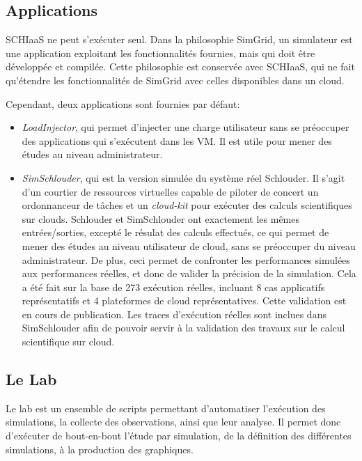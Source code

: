 \documentclass[parallelisme]{compas2017}
\begin{document}
\subsection{Applications}

SCHIaaS ne peut s'exécuter seul. Dans  la philosophie SimGrid, un simulateur est
une  application exploitant  les fonctionnalités  fournies, mais  qui doit  être
développée et  compilée.  Cette philosophie  est conservée avec SCHIaaS,  qui ne
fait qu'étendre les  fonctionnalités de SimGrid avec celles  disponibles dans un
cloud.

Cependant, deux applications sont fournies par défaut: 
\begin{itemize}
\item \emph{LoadInjector}, qui permet d'injecter  une charge utilisateur sans se
  préoccuper des  applications qui s'exécutent  dans les  VM. Il est  utile pour
  mener des études au niveau administrateur.
\item  \emph{SimSchlouder},  qui   est  la  version  simulée   du  système  réel
  Schlouder\cite{Michon2017}.  Il s'agit d'un  courtier de ressources virtuelles
  capable   de  piloter   de   concert   un  ordonnanceur   de   tâches  et   un
  \textit{cloud-kit}  pour  exécuter  des   calculs  scientifiques  sur  clouds.
  Schlouder et SimSchlouder ont exactement les mêmes entrées/sorties, excepté le
  résulat des  calculs effectués, ce  qui permet de  mener des études  au niveau
  utilisateur de  cloud, sans se  préoccuper du niveau administrateur.  De plus,
  ceci permet de confronter les  performances simulées aux performances réelles,
  et donc de valider la précision de la  simulation. Cela a été fait sur la base
  de  273 exécution  réelles, incluant  8  cas applicatifs  représentatifs et  4
  plateformes  de  cloud  représentatives.  Cette validation  est  en  cours  de
  publication.  Les traces  d'exécution réelles  sont inclues  dans SimSchlouder
  afin de pouvoir servir à la  validation des travaux sur le calcul scientifique
  sur cloud.
\end{itemize}

\subsection{Le Lab}

Le lab est un ensemble de scripts permettant d'automatiser l'exécution des simulations, la collecte des
observations, ainsi que leur analyse. Il permet donc d'exécuter de bout-en-bout l'étude par simulation,
de la définition des différentes simulations, à la production des graphiques.
\end{document}
